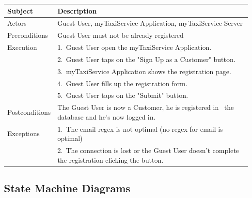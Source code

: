 \documentclass{report}
\begin{document}
				\begin{center}
						\begin{table}[h!]
							
							\begin{flushleft}
								\label{tab:NormalCustomerRegistrationDiagramTable}
								\begin{tabular}{ll}
									\toprule
											\textbf{Subject}
										& 
											\textbf{Description}\\
									\midrule
											Actors
										& 
											Guest User, myTaxiService Application, myTaxiService Server\\
									\midrule
											Preconditions
										& 
											Guest User must not be already registered\\
									\midrule
											Execution 
										& 
											1.~Guest User open the myTaxiService Application.\\
										&
											2.~Guest User taps on the "Sign Up as a Customer" button.\\
										&
											3.~myTaxiService Application shows the registration page.\\
										&	
											4.~Guest User fills up the registration form.\\
										&	
											5.~Guest User taps on the "Submit" button.\\
									\midrule
											Postconditions
										&
											The Guest User is now a Customer, he is registered in \ the database and he's now logged in.\\
									\midrule
											Exceptions
										&
											1.~The email regex is not optimal (no regex for email is optimal)\\
										&
											2.~The connection is lost or the Guest User doesn't complete the registration clicking the button.\\
									
									\bottomrule
								\end{tabular}
							\end{flushleft}
							
						\end{table}
					\end{center}

		\subsection{State Machine Diagrams}
\end{document}
